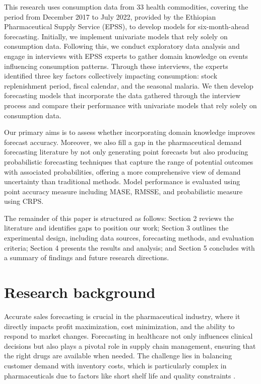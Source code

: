 \documentclass[
  authoryear,
  preprint,
  3p]{elsarticle}
\begin{document}
This research uses consumption data from 33 health commodities, covering
the period from December 2017 to July 2022, provided by the Ethiopian
Pharmaceutical Supply Service (EPSS), to develop models for
six-month-ahead forecasting. Initially, we implement univariate models
that rely solely on consumption data. Following this, we conduct
exploratory data analysis and engage in interviews with EPSS experts to
gather domain knowledge on events influencing consumption patterns.
Through these interviews, the experts identified three key factors
collectively impacting consumption: stock replenishment period, fiscal
calendar, and the seasonal malaria. We then develop forecasting models
that incorporate the data gathered through the interview process and
compare their performance with univariate models that rely solely on
consumption data.

Our primary aims is to assess whether incorporating domain knowledge
improves forecast accuracy. Moreover, we also fill a gap in the
pharmaceutical demand forecasting literature by not only generating
point forecasts but also producing probabilistic forecasting techniques
that capture the range of potential outcomes with associated
probabilities, offering a more comprehensive view of demand uncertainty
than traditional methods. Model performance is evaluated using point
accuracy measure including MASE, RMSSE, and probabilistic measure using
CRPS.

The remainder of this paper is structured as follows: Section 2 reviews
the literature and identifies gaps to position our work; Section 3
outlines the experimental design, including data sources, forecasting
methods, and evaluation criteria; Section 4 presents the results and
analysis; and Section 5 concludes with a summary of findings and future
research directions.

\section{Research background}\label{sec-lit}

Accurate sales forecasting is crucial in the pharmaceutical industry,
where it directly impacts profit maximization, cost minimization, and
the ability to respond to market changes. Forecasting in healthcare not
only influences clinical decisions but also plays a pivotal role in
supply chain management, ensuring that the right drugs are available
when needed. The challenge lies in balancing customer demand with
inventory costs, which is particularly complex in pharmaceuticals due to
factors like short shelf life and quality constraints
\citep{gupta2000mid, makridakis2020forecasting}.
\end{document}
